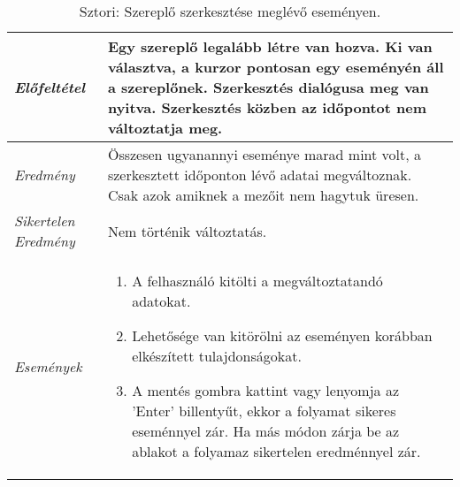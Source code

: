 \begin{table}[H]
	\centering
	\begin{tabular}{ | m{} | m{} | }
		\hline
		\emph{Előfeltétel} & Egy szereplő legalább létre van hozva. Ki van választva, a kurzor pontosan egy eseményén áll a szereplőnek. Szerkesztés dialógusa meg van nyitva. Szerkesztés közben az időpontot nem változtatja meg. \\
		\hline
		\emph{Eredmény} & Összesen ugyanannyi eseménye marad mint volt, a szerkesztett időponton lévő adatai megváltoznak. Csak azok amiknek a mezőit nem hagytuk üresen.    \\
		\hline
		\emph{Sikertelen Eredmény} & Nem történik változtatás.  \\
		\hline
		\hline
		\emph{Események} &

		\begin{enumerate}[itemsep=-1ex]
			\item A felhasználó kitölti a megváltoztatandó adatokat.
			\item Lehetősége van kitörölni az eseményen korábban elkészített tulajdonságokat.
			\item A mentés gombra kattint vagy lenyomja az 'Enter' billentyűt, ekkor a folyamat sikeres eseménnyel zár. Ha más módon zárja be az ablakot a folyamaz sikertelen eredménnyel zár.
		\end{enumerate}
		\\
		\hline
	\end{tabular}
	\caption{Sztori: Szereplő szerkesztése meglévő eseményen.}
	\label{tab:story-actor-edit-on-event}
\end{table}

